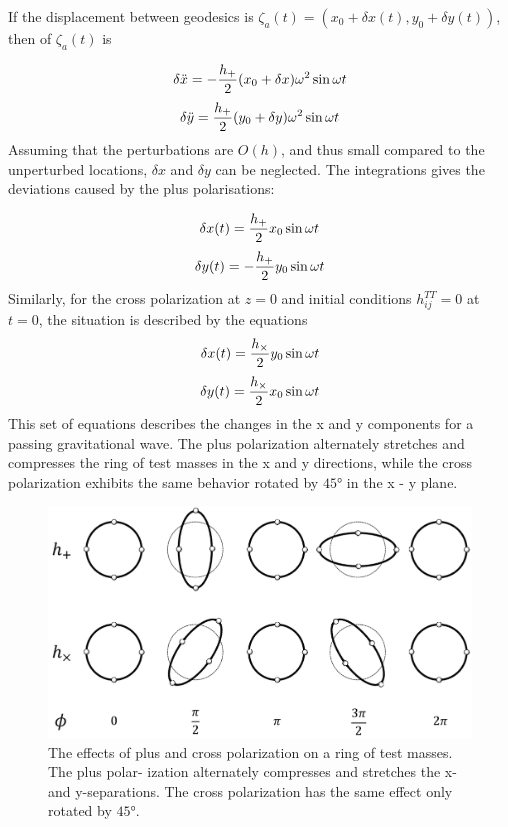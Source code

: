 \documentclass[binding=0.6cm, LaM]{sapthesis}
\begin{document}
If the displacement between geodesics is $\zeta_a (t) = (x_0 + \delta x(t), y_0 + \delta y(t))$, then of $\zeta_a (t)$ is 

\begin{equation}
\delta {\ddot x} = - {{h_{+}} \over 2} (x_0 + \delta x) \omega ^2 \sin \omega t
\end{equation}
\begin{equation}
\delta {\ddot y} =  {{h_{+}} \over 2} (y_0 + \delta y) \omega ^2 \sin \omega t
\end{equation}
Assuming that the perturbations are $O(h)$, and thus small compared to the unperturbed locations, $\delta x$ and $\delta y$ can be neglected.
The integrations gives the deviations caused by the plus polarisations:

\begin{equation}
\delta x(t) =  {{h_{+}} \over 2} x_0 \sin \omega t
\end{equation}
\begin{equation}
\delta y(t) = - {{h_{+}} \over 2} y_0  \sin \omega t
\end{equation}
Similarly, for the cross polarization at $z=0$ and initial conditions $h_{ij}^{TT} = 0$ at $t= 0$, the situation is described by the equations
\begin{equation}
\delta x(t) =  {{h_{\times}} \over 2} y_0 \sin \omega t
\end{equation}
\begin{equation}
\delta y(t) =  {{h_{\times}} \over 2} x_0  \sin \omega t
\end{equation}
This set of equations describes the changes in the x and y components for a passing gravitational wave. 
The plus polarization alternately stretches and compresses the ring of test masses in the x and y directions, while the cross polarization exhibits the same behavior rotated by $\ang{45}$ in the x - y
 plane. 

\begin{figure}
\includegraphics[scale=1]{ring}
\centering
\caption{The effects of plus and cross polarization on a ring of test masses. The plus polar- ization alternately compresses and stretches the x- and y-separations. 
The cross polarization has the same effect only rotated by  $\ang{45}$.}
\label{fig:ring}
\end{figure}
\end{document}
